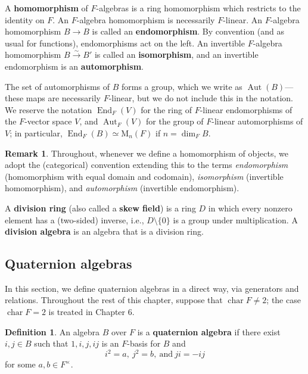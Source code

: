 \documentclass{article}
\theoremstyle{definition}
\newtheorem{definition}[theorem]{Definition}
\newtheorem{remark}[theorem]{Remark}
\begin{document}
A \textbf{homomorphism} of $F$-algebras is a ring homomorphism which restricts to the identity on $F$. An $F$-algebra homomorphism is necessarily $F$-linear. An $F$-algebra homomorphism $B \to B$ is called an \textbf{endomorphism}. By convention (and as usual for functions), endomorphisms act on the left. An invertible $F$-algebra homomorphism $B \xrightarrow{\sim} B'$ is called an \textbf{isomorphism}, and an invertible endomorphism is an \textbf{automorphism}.

The set of automorphisms of $B$ forms a group, which we write as $\operatorname{Aut}(B)$---these maps are necessarily $F$-linear, but we do not include this in the notation. We reserve the notation $\operatorname{End}_F(V)$ for the ring of $F$-linear endomorphisms of the $F$-vector space $V$, and $\operatorname{Aut}_F(V)$ for the group of $F$-linear automorphisms of $V$; in particular, $\operatorname{End}_F(B) \simeq \mathrm{M}_n(F)$ if $n = \dim_F B$.

\begin{remark}
Throughout, whenever we define a homomorphism of objects, we adopt the (categorical) convention extending this to the terms \emph{endomorphism} (homomorphism with equal domain and codomain), \emph{isomorphism} (invertible homomorphism), and \emph{automorphism} (invertible endomorphism).
\end{remark}

A \textbf{division ring} (also called a \textbf{skew field}) is a ring $D$ in which every nonzero element has a (two-sided) inverse, i.e., $D \setminus \{0\}$ is a group under multiplication. A \textbf{division algebra} is an algebra that is a division ring.

\subsection{Quaternion algebras}

In this section, we define quaternion algebras in a direct way, via generators and relations. Throughout the rest of this chapter, suppose that $\operatorname{char} F \neq 2$; the case $\operatorname{char} F = 2$ is treated in Chapter 6.

\begin{definition}
An algebra $B$ over $F$ is a \textbf{quaternion algebra} if there exist $i, j \in B$ such that $1, i, j, ij$ is an $F$-basis for $B$ and
$$i^2 = a, \ j^2 = b, \ \text{and} \ ji = -ij \tag{2.2.2}$$
for some $a, b \in F^\times$.
\end{definition}
\end{document}
